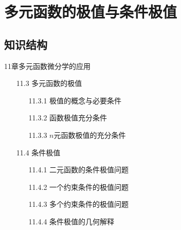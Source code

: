 \documentclass[12pt,UTF8]{ctexart}
\begin{document}
\setcounter{section}{16}
\section{多元函数的极值与条件极值}
\subsection{知识结构}
11章多元函数微分学的应用
	\begin{enumerate}
		\item[11.3]多元函数的极值
		\begin{enumerate}
			\item[11.3.1]极值的概念与必要条件
			\item[11.3.2]函数极值充分条件
			\item[11.3.3]$n$元函数极值的充分条件
		\end{enumerate}
		\item[11.4]条件极值
		\begin{enumerate}
			\item[11.4.1]二元函数的条件极值问题
			\item[11.4.2]一个约束条件的极值问题
			\item[11.4.3]多个约束条件的极值问题
			\item[11.4.4]条件极值的几何解释
		\end{enumerate}
	\end{enumerate}
\end{document}
